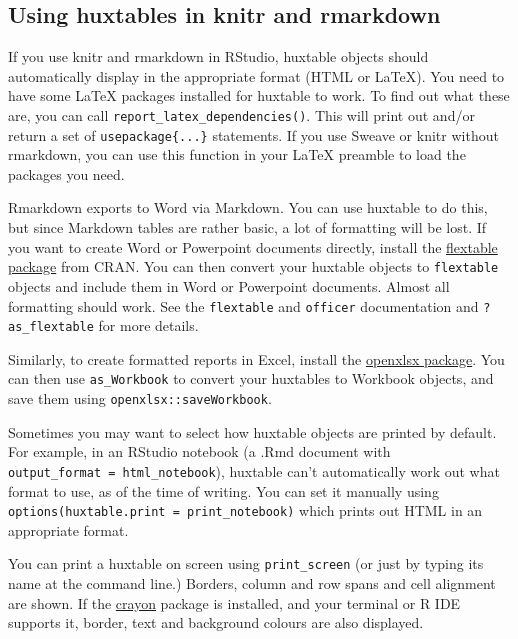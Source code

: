 \documentclass[]{article}
\begin{document}
\FloatBarrier

\subsection{Using huxtables in knitr and
rmarkdown}\label{using-huxtables-in-knitr-and-rmarkdown}

If you use knitr and rmarkdown in RStudio, huxtable objects should
automatically display in the appropriate format (HTML or LaTeX). You
need to have some LaTeX packages installed for huxtable to work. To find
out what these are, you can call \texttt{report\_latex\_dependencies()}.
This will print out and/or return a set of \texttt{usepackage\{...\}}
statements. If you use Sweave or knitr without rmarkdown, you can use
this function in your LaTeX preamble to load the packages you need.

Rmarkdown exports to Word via Markdown. You can use huxtable to do this,
but since Markdown tables are rather basic, a lot of formatting will be
lost. If you want to create Word or Powerpoint documents directly,
install the
\href{https://cran.r-project.org/package=flextable}{flextable package}
from CRAN. You can then convert your huxtable objects to
\texttt{flextable} objects and include them in Word or Powerpoint
documents. Almost all formatting should work. See the \texttt{flextable}
and \texttt{officer} documentation and \texttt{?as\_flextable} for more
details.

Similarly, to create formatted reports in Excel, install the
\href{https://cran.r-project.org/package=openxlsx}{openxlsx package}.
You can then use \texttt{as\_Workbook} to convert your huxtables to
Workbook objects, and save them using \texttt{openxlsx::saveWorkbook}.

Sometimes you may want to select how huxtable objects are printed by
default. For example, in an RStudio notebook (a .Rmd document with
\texttt{output\_format\ =\ html\_notebook}), huxtable can't
automatically work out what format to use, as of the time of writing.
You can set it manually using
\texttt{options(huxtable.print\ =\ print\_notebook)} which prints out
HTML in an appropriate format.

You can print a huxtable on screen using \texttt{print\_screen} (or just
by typing its name at the command line.) Borders, column and row spans
and cell alignment are shown. If the
\href{https://cran.r-project.org/package=crayon}{crayon} package is
installed, and your terminal or R IDE supports it, border, text and
background colours are also displayed.
\end{document}

